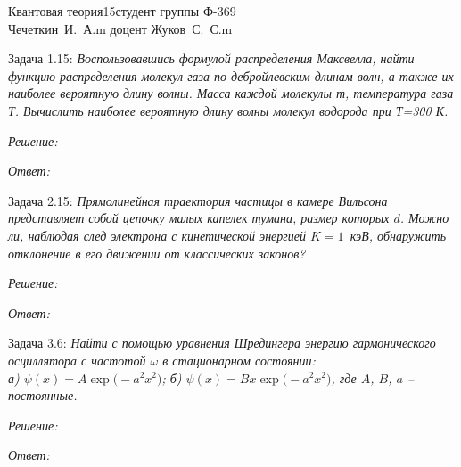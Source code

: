 



\newcommand{\ds}{\displaystyle}
\newcommand{\h}{\hbar}
\newcommand{\comm}[2]{\left[#1,\ #2\right]}


{Квантовая теория}{}{15}{студент группы Ф-369\\Чечеткин~И.~А.}{m}
{доцент Жуков~С.~С.}{m}

\newpage

Задача 1.15: \emph{Воспользовавшись формулой распределения Максвелла, найти 
функцию распределения молекул газа по дебройлевским длинам волн, 
а также их наиболее вероятную длину волны. Масса каждой молекулы 
т, температура газа Т. Вычислить наиболее вероятную длину волны 
молекул водорода при Т=300 К.}

\vspace*{2em}
\emph{Решение:}

\vspace*{2em}        
\emph{Ответ:}

\newpage

Задача 2.15: \emph{Прямолинейная траектория частицы в камере Вильсона
представляет собой цепочку малых капелек тумана, размер которых \( d \). Можно
ли, наблюдая след электрона с кинетической энергией \( K = 1 \)~кэВ, обнаружить
отклонение в его движении от классических законов?}

\vspace*{2em}
\emph{Решение:}

\vspace*{2em}
\emph{Ответ:}

\newpage

Задача 3.6: \emph{Найти с помощью уравнения Шредингера энергию гармонического
осциллятора с частотой \( \omega \) в стационарном состоянии:\\
а) \( \ds \psi(x) = A\exp\big(-a^2x^2\big) \); б) \( \ds \psi(x) = Bx\exp\big(
-a^2x^2\big) \), где \( A \), \( B \), \( a \) -- постоянные.}

\vspace*{2em}
\emph{Решение:}

\vspace*{2em}
\emph{Ответ:}

